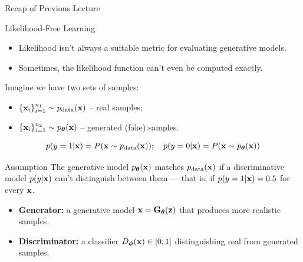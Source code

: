 \documentclass{beamer}
\begin{document}
\begin{frame}{Recap of Previous Lecture}
	\begin{block}{Likelihood-Free Learning}
		\begin{itemize}
			\item Likelihood isn't always a suitable metric for evaluating generative models.
			\item Sometimes, the likelihood function can't even be computed exactly.
		\end{itemize}
	\end{block}
	\vspace{-0.3cm}
	Imagine we have two sets of samples:
	\begin{itemize}
		\item $\{\mathbf{x}_i\}_{i=1}^{n_1} \sim p_{\text{data}}(\mathbf{x})$ -- real samples;
		\item $\{\mathbf{x}_i\}_{i=1}^{n_2} \sim p_{\boldsymbol{\theta}}(\mathbf{x})$ -- generated (fake) samples.
	\end{itemize}
	\vspace{-0.2cm}
	\[
		p(y = 1 | \mathbf{x}) = P(\mathbf{x} \sim p_{\text{data}}(\mathbf{x})); \quad p(y = 0 | \mathbf{x}) = P(\mathbf{x} \sim p_{\boldsymbol{\theta}}(\mathbf{x}))
	\]
	\vspace{-0.7cm}
	\begin{block}{Assumption}
		The generative model $p_{\boldsymbol{\theta}}(\mathbf{x})$ matches $p_{\text{data}}(\mathbf{x})$ if a discriminative model $p(y | \mathbf{x})$ can't distinguish between them --- that is, if $p(y = 1 | \mathbf{x}) = 0.5$ for every $\mathbf{x}$.
	\end{block}
	\vspace{-0.3cm}
	\begin{itemize}
		\item \textbf{Generator:} a generative model $\mathbf{x} = \mathbf{G}_{\boldsymbol{\theta}}(\mathbf{z})$ that produces more realistic samples.
		\item \textbf{Discriminator:} a classifier $D_{\boldsymbol{\phi}}(\mathbf{x}) \in [0, 1]$ distinguishing real from generated samples.
	\end{itemize}
\end{frame}
\end{document}
